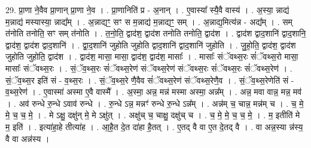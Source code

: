 \documentclass[17pt]{extarticle}
\begin{document}
29. प्रा॒णा ने॒वैव प्रा॒णान् प्रा॒णा ने॒व । . प्रा॒णानिति॑ प्र - अ॒नान् । . ए॒वास्या᳚ स्यै॒वै वास्य॑ । . अ॒स्या॒ न्नाद्य॑ म॒न्नाद्य॑ मस्यास्या॒ न्नाद्य᳚म् । . अ॒न्नाद्यꣳ॒॒ सꣳ स म॒न्नाद्य॑ म॒न्नाद्यꣳ॒॒ सम् । . अ॒न्नाद्य॒मित्य॑न्न - अद्य᳚म् । . सम् त॑नोति तनोति॒ सꣳ सम् त॑नोति । . त॒नो॒ति॒ द्वाद॑श॒ द्वाद॑श तनोति तनोति॒ द्वाद॑श । . द्वाद॑श द्वाद॒शानि॑ द्वाद॒शानि॒ द्वाद॑श॒ द्वाद॑श द्वाद॒शानि॑ । . द्वा॒द॒शानि॑ जुहोति जुहोति द्वाद॒शानि॑ द्वाद॒शानि॑ जुहोति । . जु॒हो॒ति॒ द्वाद॑श॒ द्वाद॑श जुहोति जुहोति॒ द्वाद॑श । . द्वाद॑श॒ मासा॒ मासा॒ द्वाद॑श॒ द्वाद॑श॒ मासाः᳚ । . मासाः᳚ संॅवथ्स॒रः सं॑ॅवथ्स॒रो मासा॒ मासाः᳚ संॅवथ्स॒रः । . सं॒ॅव॒थ्स॒रः सं॑ॅवथ्स॒रेण॑ संॅवथ्स॒रेण॑ संॅवथ्स॒रः सं॑ॅवथ्स॒रः सं॑ॅवथ्स॒रेण॑ । . सं॒ॅव॒थ्स॒र इति॑ सं - व॒थ्स॒रः । . सं॒ॅव॒थ्स॒रे णै॒वैव सं॑ॅवथ्स॒रेण॑ संॅवथ्स॒रेणै॒व । . सं॒ॅव॒थ्स॒रेणेति॑ सं - व॒थ्स॒रेण॑ । . ए॒वास्मा॑ अस्मा ए॒वै वास्मै᳚ । . अ॒स्मा॒ अन्न॒ मन्न॑ मस्मा अस्मा॒ अन्न᳚म् । . अन्न॒ मवा वान्न॒ मन्न॒ मव॑ । . अव॑ रुन्धे रु॒न्धे ऽवाव॑ रुन्धे । . रु॒न्धे ऽन्न॒ मन्नꣳ॑ रुन्धे रु॒न्धे ऽन्न᳚म् । . अन्न॑म् च॒ चान्न॒ मन्न॑म् च । . च॒ मे॒ मे॒ च॒ च॒ मे॒ । . मे ऽक्षु॒ दक्षु॑न् मे॒ मे ऽक्षु॑त् । . अक्षु॑च् च॒ चाक्षु॒ दक्षु॑च् च । . च॒ मे॒ मे॒ च॒ च॒ मे॒ । . म॒ इतीति॑ मे म॒ इति॑ । . इत्या॑हा॒हे तीत्या॑ह । . आ॒है॒त दे॒त दा॑हा है॒तत् । . ए॒तद् वै वा ए॒त दे॒तद् वै । . वा अन्न॒स्या न्न॑स्य॒ वै वा अन्न॑स्य । \newline
\end{document}
